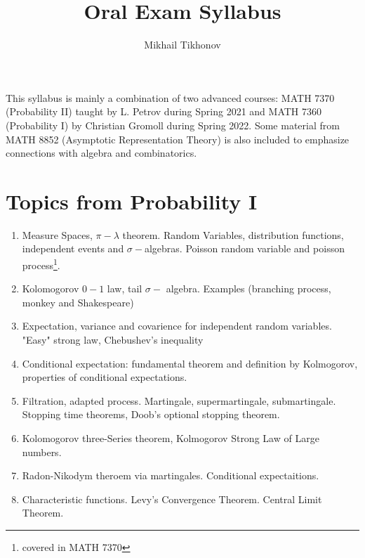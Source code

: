\documentclass{article}
\title{Oral Exam Syllabus}
\author{Mikhail Tikhonov}
\date{}
\begin{document}
\maketitle

This syllabus is mainly a combination of two advanced courses: MATH 7370 (Probability II) taught by L. Petrov during Spring 2021 and MATH 7360 (Probability I) by Christian Gromoll during Spring 2022. Some material from MATH 8852 (Asymptotic Representation Theory) is also included to emphasize connections with algebra and combinatorics.

\section*{Topics from Probability I}

\begin{enumerate}
    \item Measure Spaces, $\pi - \lambda$ theorem. Random Variables, distribution functions, independent events and $\sigma-$algebras. Poisson random variable and poisson process\footnote{covered in MATH 7370}.
    \item Kolomogorov $0-1$ law, tail $\sigma-$ algebra. Examples (branching process, monkey and Shakespeare)
    \item Expectation, variance and covarience for independent random variables. "Easy" strong law, Chebushev's inequality
    \item Conditional expectation: fundamental theorem and definition by Kolmogorov, properties of conditional expectations. 
    \item Filtration, adapted process. Martingale, supermartingale, submartingale. Stopping time theorems, Doob's optional stopping theorem.
    \item Kolomogorov three-Series theorem, Kolmogorov Strong Law of Large numbers. 
    \item Radon-Nikodym theroem via martingales. Conditional expectaitions.
    \item Characteristic functions. Levy's Convergence Theorem. Central Limit Theorem. 
\end{enumerate}
\end{document}

